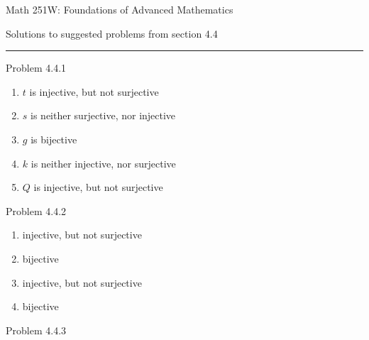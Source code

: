 \documentclass{article}
\theoremstyle{definition}
\begin{document}
	\begin{center}
		\Large{Math 251W: Foundations of Advanced Mathematics}

		\normalsize Solutions to suggested problems from section 4.4 \hrule
		\vspace{0.4cm}

	\end{center}


	\noindent Problem 4.4.1  \vspace{0.3cm}

	\begin{enumerate}
		\item $t$ is injective, but not surjective
		\item $s$ is neither surjective, nor injective
		\item $g$ is bijective
		\item $k$ is neither injective, nor surjective
		\item $Q$ is injective, but not surjective
	\end{enumerate}

	\vspace{1cm}


	\noindent Problem 4.4.2  \vspace{0.3cm}

	\begin{enumerate}
		\item injective, but not surjective
		\item bijective
		\item injective, but not surjective
		\item bijective
	\end{enumerate}

	\vspace{1cm}


	\noindent Problem 4.4.3  \vspace{0.3cm}
\end{document}
